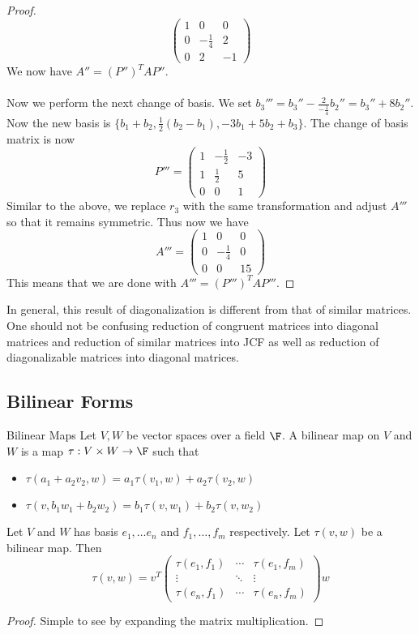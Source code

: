 \begin{eg}{}{}
\begin{proof}
$$\begin{pmatrix}
1 & 0 & 0\\
0 & -\frac{1}{4} & 2\\
0 & 2 & -1
\end{pmatrix}$$
We now have $A''=(P'')^TAP''$. \\~\\
Now we perform the next change of basis. We set $b_3'''=b_3''-\frac{2}{-\frac{1}{4}}b_2''=b_3''+8b_2''$. Now the new basis is $\{b_1+b_2,\frac{1}{2}(b_2-b_1),-3b_1+5b_2+b_3\}$. The change of basis matrix is now $$P'''=\begin{pmatrix}
1 & -\frac{1}{2} & -3\\
1 & \frac{1}{2} & 5\\
0 & 0 & 1
\end{pmatrix}$$ Similar to the above, we replace $r_3$ with the same transformation and adjust $A'''$ so that it remains symmetric. Thus now we have $$A'''=\begin{pmatrix}
1 & 0 & 0\\
0 & -\frac{1}{4} & 0\\
0 & 0 & 15
\end{pmatrix}$$
This means that we are done with $A'''=(P''')^TAP'''$. 
\end{proof}
\end{eg}

In general, this result of diagonalization is different from that of similar matrices. One should not be confusing reduction of congruent matrices into diagonal matrices and reduction of similar matrices into JCF as well as reduction of diagonalizable matrices into diagonal matrices. 

\subsection{Bilinear Forms}
\begin{defn}{Bilinear Maps}{} Let $V,W$ be vector spaces over a field $\F$. A bilinear map on $V$ and $W$ is a map $\tau:V\times W\to\F$ such that 
\begin{itemize}
\item $\tau(a_1+a_2v_2,w)=a_1\tau(v_1,w)+a_2\tau(v_2,w)$
\item $\tau(v,b_1w_1+b_2w_2)=b_1\tau(v,w_1)+b_2\tau(v,w_2)$
\end{itemize}
\end{defn}

\begin{thm}{}{} Let $V$ and $W$ has basis $e_1,\dots e_n$ and $f_1,\dots,f_m$ respectively. Let $\tau(v,w)$ be a bilinear map. Then $$\tau(v,w)=v^T\begin{pmatrix}
\tau(e_1,f_1) & \cdots & \tau(e_1,f_m)\\
\vdots & \ddots & \vdots\\
\tau(e_n,f_1) & \cdots & \tau(e_n,f_m)
\end{pmatrix}w$$ \tcbline
\begin{proof}
Simple to see by expanding the matrix multiplication. 
\end{proof}
\end{thm}


